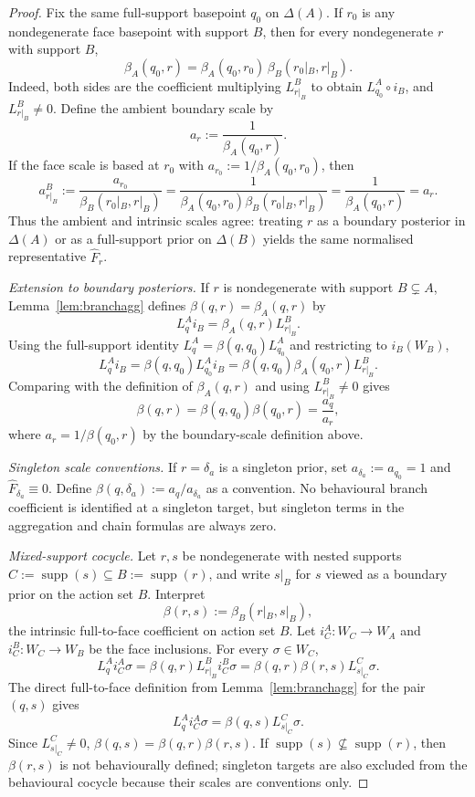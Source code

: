 \documentclass[11pt,a4paper]{article}
\theoremstyle{definition}
\newcommand{\1}{\mathbf 1}
\begin{document}
\begin{proof}
Fix the same full-support basepoint $q_0$ on $\Delta(A)$.  If $r_0$ is any nondegenerate face basepoint with support $B$,
then for every nondegenerate $r$ with support $B$,
\[
\beta_A(q_0,r)=\beta_A(q_0,r_0)\,\beta_B(r_0|_B,r|_B).
\]
Indeed, both sides are the coefficient multiplying $L_{r|_B}^B$ to obtain $L_{q_0}^A\circ i_B$, and
$L_{r|_B}^B\ne0$.  Define the ambient boundary scale by
\[
a_r:=\frac{1}{\beta_A(q_0,r)}.
\]
If the face scale is based at $r_0$ with $a_{r_0}:=1/\beta_A(q_0,r_0)$, then
\[
a_{r|_B}^B:=\frac{a_{r_0}}{\beta_B(r_0|_B,r|_B)}
=\frac{1}{\beta_A(q_0,r_0)\beta_B(r_0|_B,r|_B)}
=\frac{1}{\beta_A(q_0,r)}
=a_r.
\]
Thus the ambient and intrinsic scales agree: treating $r$ as a boundary posterior in $\Delta(A)$ or as a full-support prior
on $\Delta(B)$ yields the same normalised representative $\widehat F_r$.

\emph{Extension to boundary posteriors.}  If $r$ is nondegenerate with support $B\subsetneq A$, Lemma~\ref{lem:branchagg}
defines
$\beta(q,r)=\beta_A(q,r)$ by
\[
L_q^A i_B=\beta_A(q,r)L_{r|_B}^B .
\]
Using the full-support identity $L_q^A=\beta(q,q_0)L_{q_0}^A$ and restricting to $i_B(W_B)$,
\[
L_q^A i_B=\beta(q,q_0)L_{q_0}^A i_B
=\beta(q,q_0)\beta_A(q_0,r)L_{r|_B}^B.
\]
Comparing with the definition of $\beta_A(q,r)$ and using $L_{r|_B}^B\ne0$ gives
\[
\beta(q,r)=\beta(q,q_0)\beta(q_0,r)=\frac{a_q}{a_r},
\]
where $a_r=1/\beta(q_0,r)$ by the boundary-scale definition above.

\emph{Singleton scale conventions.}  If $r=\delta_a$ is a singleton prior, set $a_{\delta_a}:=a_{q_0}=1$ and
$\widehat F_{\delta_a}\equiv0$.  Define $\beta(q,\delta_a):=a_q/a_{\delta_a}$ as a convention.  No behavioural branch
coefficient is identified at a singleton target, but singleton terms in the aggregation and chain formulas are always zero.

\emph{Mixed-support cocycle.}  Let $r,s$ be nondegenerate with nested supports
$C:=\operatorname{supp}(s)\subseteq B:=\operatorname{supp}(r)$, and write $s|_B$ for $s$ viewed as a boundary prior on
the action set $B$.  Interpret
\[
\beta(r,s):=\beta_B(r|_B,s|_B),
\]
the intrinsic full-to-face coefficient on action set $B$.  Let $i_C^A:W_C\to W_A$ and $i_C^B:W_C\to W_B$ be the face
inclusions.  For every $\sigma\in W_C$,
\[
L_q^A i_C^A\sigma
=\beta(q,r)L_{r|_B}^B i_C^B\sigma
=\beta(q,r)\beta(r,s)L_{s|_C}^C\sigma.
\]
The direct full-to-face definition from Lemma~\ref{lem:branchagg} for the pair $(q,s)$ gives
\[
L_q^A i_C^A\sigma=\beta(q,s)L_{s|_C}^C\sigma.
\]
Since $L_{s|_C}^C\ne0$, $\beta(q,s)=\beta(q,r)\beta(r,s)$.  If
$\operatorname{supp}(s)\not\subseteq\operatorname{supp}(r)$, then $\beta(r,s)$ is not behaviourally defined; singleton
targets are also excluded from the behavioural cocycle because their scales are conventions only.


\end{proof}
\end{document}
